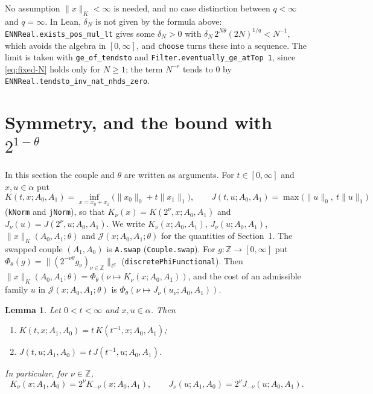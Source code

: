 \documentclass[11pt]{article}
\newtheorem{lemma}[theorem]{Lemma}
\theoremstyle{definition}
\theoremstyle{remark}
\newcommand{\norm}[2]{\lVert #1\rVert_{#2}}
\newcommand{\cJ}{\mathcal J}
\newcommand{\Z}{\mathbb Z}
\begin{document}
\medskip
No assumption \(\norm{x}{K} < \infty\) is needed, and no case distinction between
\(q < \infty\) and \(q = \infty\). In Lean, \(\delta_N\) is not given by the formula above:
\texttt{ENNReal.exists\_pos\_mul\_lt} gives some \(\delta_N > 0\) with
\(\delta_N\, 2^{N\theta} (2N)^{1/q} < N^{-1}\), which avoids the algebra in \([0,\infty]\),
and \texttt{choose} turns these into a sequence. The limit is taken with
\texttt{ge\_of\_tendsto} and \texttt{Filter.eventually\_ge\_atTop 1}, since
\eqref{eq:fixed-N} holds only for \(N \ge 1\); the term \(N^{-r}\) tends to \(0\) by
\texttt{ENNReal.tendsto\_inv\_nat\_nhds\_zero}.

\section{Symmetry, and the bound with \(2^{1-\theta}\)}

In this section the couple and \(\theta\) are written as arguments. For \(t \in [0,\infty]\)
and \(x, u \in \alpha\) put
\[
  K(t,x;A_0,A_1) = \inf_{x = x_0 + x_1}\bigl(\norm{x_0}{0} + t\norm{x_1}{1}\bigr),\qquad
  J(t,u;A_0,A_1) = \max\bigl(\norm{u}{0},\ t\norm{u}{1}\bigr)
\]
(\texttt{kNorm} and \texttt{jNorm}), so that \(K_\nu(x) = K(2^\nu,x;A_0,A_1)\) and
\(J_\nu(u) = J(2^\nu,u;A_0,A_1)\). We write \(K_\nu(x;A_0,A_1)\), \(J_\nu(u;A_0,A_1)\),
\(\norm{x}{K}(A_0,A_1;\theta)\) and \(\cJ(x;A_0,A_1;\theta)\) for the quantities of
Section~1. The swapped couple \((A_1,A_0)\) is \texttt{A.swap} (\texttt{Couple.swap}).
For \(g \colon \Z \to [0,\infty]\) put
\(\Phi_\theta(g) = \lVert (2^{-\nu\theta} g_\nu)_{\nu\in\Z} \rVert_{\ell^q}\)
(\texttt{discretePhiFunctional}). Then
\(\norm{x}{K}(A_0,A_1;\theta) = \Phi_\theta(\nu \mapsto K_\nu(x;A_0,A_1))\), and the cost of an
admissible family \(u\) in \(\cJ(x;A_0,A_1;\theta)\) is
\(\Phi_\theta(\nu \mapsto J_\nu(u_\nu;A_0,A_1))\).

\begin{lemma}\label{lem:swap-KJ}
  Let \(0 < t < \infty\) and \(x, u \in \alpha\). Then
  \begin{enumerate}
    \item[(a)] \(K(t,x;A_1,A_0) = t\,K(t^{-1},x;A_0,A_1)\);
    \item[(b)] \(J(t,u;A_1,A_0) = t\,J(t^{-1},u;A_0,A_1)\).
  \end{enumerate}
  In particular, for \(\nu \in \Z\),
  \[
    K_\nu(x;A_1,A_0) = 2^\nu K_{-\nu}(x;A_0,A_1),\qquad
    J_\nu(u;A_1,A_0) = 2^\nu J_{-\nu}(u;A_0,A_1).
  \]
\end{lemma}
\end{document}
